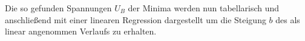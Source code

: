 \begin{center}
\begin{minipage}{\linewidth}
\label{a2a}
\end{minipage}
\begin{minipage}{\linewidth}
\centering
{}
\label{a2b}
\end{minipage}
\begin{minipage}{\linewidth}
\centering
{}
\label{a2c}
\end{minipage}
\end{center}
Die so gefunden Spannungen \(U_B\) der Minima werden nun tabellarisch und anschließend mit einer linearen Regression dargestellt um die Steigung \(b\) des als linear angenommen Verlaufs zu erhalten.
